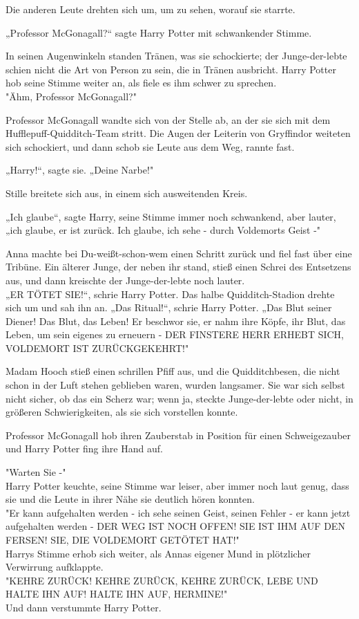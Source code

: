 {Die anderen Leute drehten sich um, um zu sehen, worauf sie starrte.

„Professor McGonagall?“ sagte Harry Potter mit schwankender Stimme.

In seinen Augenwinkeln standen Tränen, was sie schockierte; der Junge-der-lebte schien nicht die Art von Person zu sein, die in Tränen ausbricht. Harry Potter hob seine Stimme weiter an, als fiele es ihm schwer zu sprechen.\\ "Ähm, Professor McGonagall?"

Professor McGonagall wandte sich von der Stelle ab, an der sie sich mit dem Hufflepuff-Quidditch-Team stritt. Die Augen der Leiterin von Gryffindor weiteten sich schockiert, und dann schob sie Leute aus dem Weg, rannte fast.

„Harry!“, sagte sie. „Deine Narbe!"

Stille breitete sich aus, in einem sich ausweitenden Kreis.

„Ich glaube“, sagte Harry, seine Stimme immer noch schwankend, aber lauter, „ich glaube, er ist zurück. Ich glaube, ich sehe - durch Voldemorts Geist -"

Anna machte bei Du-weißt-schon-wem einen Schritt zurück und fiel fast über eine Tribüne. Ein älterer Junge, der neben ihr stand, stieß einen Schrei des Entsetzens aus, und dann kreischte der Junge-der-lebte noch lauter.\\ „ER TÖTET SIE!“, schrie Harry Potter. Das halbe Quidditch-Stadion drehte sich um und sah ihn an. „Das Ritual!“, schrie Harry Potter. „Das Blut seiner Diener! Das Blut, das Leben! Er beschwor sie, er nahm ihre Köpfe, ihr Blut, das Leben, um sein eigenes zu erneuern - DER FINSTERE HERR ERHEBT SICH, VOLDEMORT IST ZURÜCKGEKEHRT!"

Madam Hooch stieß einen schrillen Pfiff aus, und die Quidditchbesen, die nicht schon in der Luft stehen geblieben waren, wurden langsamer. Sie war sich selbst nicht sicher, ob das ein Scherz war; wenn ja, steckte Junge-der-lebte oder nicht, in größeren Schwierigkeiten, als sie sich vorstellen konnte.

Professor McGonagall hob ihren Zauberstab in Position für einen Schweigezauber und Harry Potter fing ihre Hand auf.

"Warten Sie -"\\ Harry Potter keuchte, seine Stimme war leiser, aber immer noch laut genug, dass sie und die Leute in ihrer Nähe sie deutlich hören konnten.\\ "Er kann aufgehalten werden - ich sehe seinen Geist, seinen Fehler - er kann jetzt aufgehalten werden - DER WEG IST NOCH OFFEN! SIE IST IHM AUF DEN FERSEN! SIE, DIE VOLDEMORT GETÖTET HAT!"\\ Harrys Stimme erhob sich weiter, als Annas eigener Mund in plötzlicher Verwirrung aufklappte.\\ "KEHRE ZURÜCK! KEHRE ZURÜCK, KEHRE ZURÜCK, LEBE UND HALTE IHN AUF! HALTE IHN AUF, HERMINE!"\\ Und dann verstummte Harry Potter.

}
